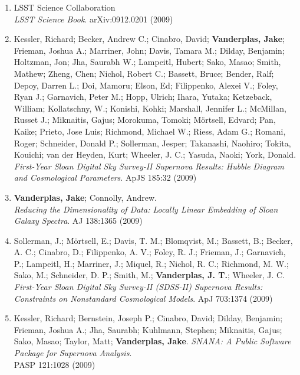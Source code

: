 {\begin{enumerate}
         van der Heyden, K. J.; {\bf Vanderplas, J. T.}; Wheeler, J. C.; 
         heng, C.\\
         {\it First-year Sloan Digital Sky Survey-II supernova results:
          consistency and constraints with other intermediate-redshift
          data sets}.
          MNRAS 401:2331 (2010)
   \item LSST Science Collaboration\\
         {\it LSST Science Book}.
         arXiv:0912.0201 (2009)
   \item Kessler, Richard; Becker, Andrew C.; Cinabro, David;
         {\bf Vanderplas, Jake}; Frieman, Joshua A.; Marriner, John;
         Davis, Tamara M.; Dilday, Benjamin; Holtzman, Jon; Jha, Saurabh W.;
         Lampeitl, Hubert; Sako, Masao; Smith, Mathew; Zheng, Chen;
         Nichol, Robert C.; Bassett, Bruce; Bender, Ralf; Depoy, Darren L.;
         Doi, Mamoru; Elson, Ed; Filippenko, Alexei V.; Foley, Ryan J.;
         Garnavich, Peter M.; Hopp, Ulrich; Ihara, Yutaka; Ketzeback, William;
         Kollatschny, W.; Konishi, Kohki; Marshall, Jennifer L.;
         McMillan, Russet J.; Miknaitis, Gajus; Morokuma, Tomoki;
         Mörtsell, Edvard; Pan, Kaike; Prieto, Jose Luis; Richmond, Michael W.;
         Riess, Adam G.; Romani, Roger; Schneider, Donald P.;
         Sollerman, Jesper; Takanashi, Naohiro; Tokita, Kouichi;
         van der Heyden, Kurt; Wheeler, J. C.; Yasuda, Naoki; York, Donald.\\
         {\it First-Year Sloan Digital Sky Survey-II Supernova Results:
           Hubble Diagram and Cosmological Parameters}.
         ApJS 185:32 (2009)
   \item {\bf Vanderplas, Jake}; Connolly, Andrew.\\
         {\it Reducing the Dimensionality of Data: Locally Linear Embedding
              of Sloan Galaxy Spectra}.
         AJ 138:1365 (2009)
   \item Sollerman, J.; Mörtsell, E.; Davis, T. M.; Blomqvist, M.; Bassett, B.;
         Becker, A. C.; Cinabro, D.; Filippenko, A. V.; Foley, R. J.;
         Frieman, J.; Garnavich, P.; Lampeitl, H.; Marriner, J.; Miquel, R.;
         Nichol, R. C.; Richmond, M. W.; Sako, M.; Schneider, D. P.; Smith, M.;
         {\bf Vanderplas, J. T.}; Wheeler, J. C.\\
         {\it First-Year Sloan Digital Sky Survey-II (SDSS-II) Supernova
              Results: Constraints on Nonstandard Cosmological Models}.
         ApJ 703:1374 (2009)
   \item Kessler, Richard; Bernstein, Joseph P.; Cinabro, David;
         Dilday, Benjamin; Frieman, Joshua A.; Jha, Saurabh; Kuhlmann, Stephen;
         Miknaitis, Gajus; Sako, Masao; Taylor, Matt; {\bf Vanderplas, Jake}.
         {\it SNANA: A Public Software Package for Supernova Analysis}.\\
         PASP 121:1028 (2009)
\end{enumerate}
}
